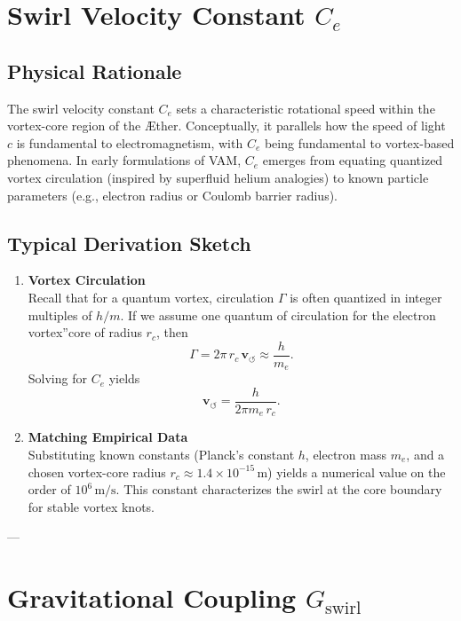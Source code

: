 \section{Swirl Velocity Constant \(C_e\)}

\subsection{Physical Rationale}
The swirl velocity constant \(C_e\) sets a characteristic rotational speed within the vortex-core region of the Æther. Conceptually, it parallels how the speed of light \(c\) is fundamental to electromagnetism, with \(C_e\) being fundamental to vortex-based phenomena. In early formulations of VAM, \(C_e\) emerges from equating quantized vortex circulation (inspired by superfluid helium analogies) to known particle parameters (e.g., electron radius or Coulomb barrier radius).

\subsection{Typical Derivation Sketch}
\begin{enumerate}
    \item \textbf{Vortex Circulation} \\
    Recall that for a quantum vortex, circulation \(\Gamma\) is often quantized in integer multiples of \(h/m\). If we assume one quantum of circulation for the \grqq electron vortex\textquotedblright core of radius \(r_c\), then
    \[
        \Gamma = 2 \pi \,r_c \,\mathbf{v}_{\scriptscriptstyle\boldsymbol{\circlearrowleft}} \approx \frac{h}{m_e}.
    \]
    Solving for \(C_e\) yields
    \[
        \mathbf{v}_{\scriptscriptstyle\boldsymbol{\circlearrowleft}}  =  \frac{h}{2 \pi m_e \,r_c}.
    \]

    \item \textbf{Matching Empirical Data} \\
    Substituting known constants (Planck's constant \(h\), electron mass \(m_e\), and a chosen vortex-core radius \(r_c\approx 1.4\times 10^{-15}\,\mathrm{m}\)) yields a numerical value on the order of \(10^6\,\mathrm{m/s}\). This constant characterizes the swirl at the core boundary for stable vortex knots.
\end{enumerate}

---

\section{Gravitational Coupling \(G_\text{swirl}\)}

